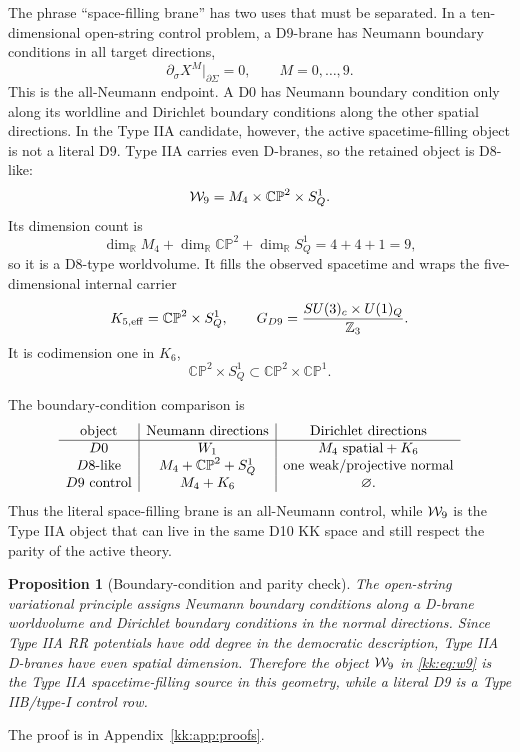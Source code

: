 \documentclass[11pt]{article}
\newcommand{\CP}{\mathbb{CP}}
\newcommand{\ZZ}{\mathbb{Z}}
\newcommand{\RR}{\mathbb{R}}
\theoremstyle{plain}
\newtheorem{proposition}{Proposition}[section]
\theoremstyle{definition}
\begin{document}
The phrase ``space-filling brane'' has two uses that must be separated.  In a
ten-dimensional open-string control problem, a D9-brane has Neumann boundary
conditions in all target directions,
\begin{equation}
  \partial_\sigma X^M|_{\partial\Sigma}=0,\qquad M=0,\ldots,9 .
  \label{kk:eq:d9neumann}
\end{equation}
This is the all-Neumann endpoint.  A D0 has Neumann boundary condition only
along its worldline and Dirichlet boundary conditions along the other spatial
directions.  In the Type IIA candidate, however, the active spacetime-filling
object is not a literal D9.  Type IIA carries even D-branes, so the retained
object is D8-like:
\begin{equation}
  {\cal W}_9=M_4\times\CP^2\times S^1_Q .
  \label{kk:eq:w9}
\end{equation}
Its dimension count is
\begin{equation}
  \dim_{\RR}M_4+\dim_{\RR}\CP^2+\dim_{\RR}S^1_Q
  =4+4+1=9,
\end{equation}
so it is a D8-type worldvolume.  It fills the observed spacetime and wraps the
five-dimensional internal carrier
\begin{equation}
  K_{5,\rm eff}=\CP^2\times S^1_Q,\qquad
  G_{D9}=\frac{SU(3)_c\times U(1)_Q}{\ZZ_3}.
  \label{kk:eq:d9endpoint}
\end{equation}
It is codimension one in \(K_6\),
\begin{equation}
  \CP^2\times S^1_Q\subset \CP^2\times\CP^1 .
\end{equation}

The boundary-condition comparison is
\begin{equation}
\begin{array}{c|c|c}
\hbox{object} & \hbox{Neumann directions} & \hbox{Dirichlet directions}\\
\hline
D0 & W_1 & M_4\hbox{ spatial}+K_6\\
D8\hbox{-like} & M_4+\CP^2+S^1_Q & \hbox{one weak/projective normal}\\
D9\hbox{ control} & M_4+K_6 & \varnothing .
\end{array}
\label{kk:eq:boundary-table}
\end{equation}
Thus the literal space-filling brane is an all-Neumann control, while
\({\cal W}_9\) is the Type IIA object that can live in the same D10 KK space and
still respect the parity of the active theory.

\begin{proposition}[Boundary-condition and parity check]
\label{kk:prop:space-filling}
The open-string variational principle assigns Neumann boundary conditions along
a D-brane worldvolume and Dirichlet boundary conditions in the normal
directions.  Since Type IIA RR potentials have odd degree in the democratic
description, Type IIA D-branes have even spatial dimension.  Therefore the
object \({\cal W}_9\) in \eqref{kk:eq:w9} is the Type IIA spacetime-filling source
in this geometry, while a literal D9 is a Type IIB/type-I control row.
\end{proposition}
The proof is in Appendix~\ref{kk:app:proofs}.
\end{document}
